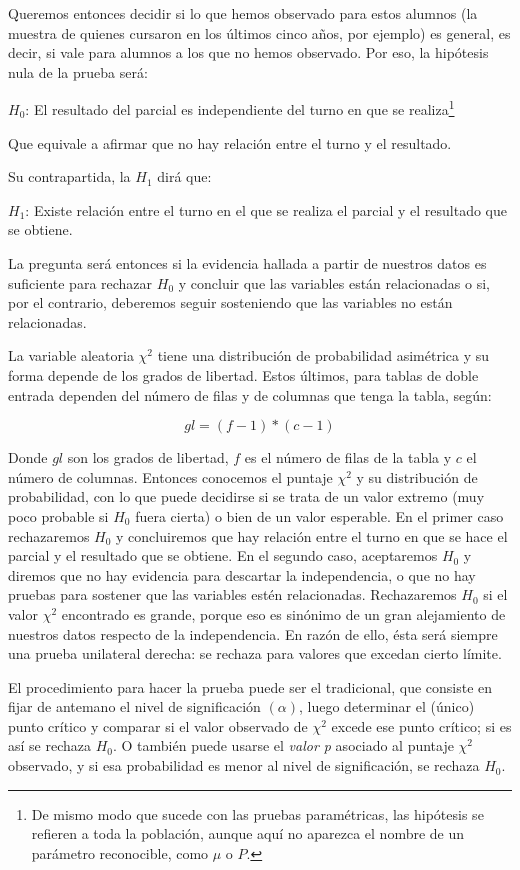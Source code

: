 \documentclass[]{book}
\let\rmarkdownfootnote\footnote%
\def\footnote{\protect\rmarkdownfootnote}
\begin{document}
Queremos entonces decidir si lo que hemos observado para estos alumnos
(la muestra de quienes cursaron en los últimos cinco años, por ejemplo)
es general, es decir, si vale para alumnos a los que no hemos observado.
Por eso, la hipótesis nula de la prueba será:

\(H_0\): El resultado del parcial es independiente del turno en que se
realiza\footnote{De mismo modo que sucede con las pruebas paramétricas, las hipótesis se refieren a toda la población, aunque aquí no aparezca el nombre de un parámetro reconocible, como \(\mu\) o \(P\).}

Que equivale a afirmar que no hay relación entre el turno y el
resultado.

Su contrapartida, la \(H_1\) dirá que:

\(H_1\): Existe relación entre el turno en el que se realiza el parcial y
el resultado que se obtiene.

La pregunta será entonces si la evidencia hallada a partir de nuestros
datos es suficiente para rechazar \(H_0\) y concluir que las variables
están relacionadas o si, por el contrario, deberemos seguir sosteniendo
que las variables no están relacionadas.

La variable aleatoria \(\chi^{2}\) tiene una distribución de probabilidad
asimétrica y su forma depende de los grados de libertad. Estos últimos,
para tablas de doble entrada dependen del número de filas y de columnas
que tenga la tabla, según:

\[gl = ( f - 1)*( c - 1)\]

Donde \(gl\) son los grados de libertad, \(f\) es el número de filas de la
tabla y \(c\) el número de columnas. Entonces conocemos el puntaje
\(\chi^{2}\) y su distribución de probabilidad, con lo que puede decidirse
si se trata de un valor extremo (muy poco probable si \(H_0\) fuera cierta)
o bien de un valor esperable. En el primer caso rechazaremos \(H_0\) y
concluiremos que hay relación entre el turno en que se hace el parcial y
el resultado que se obtiene. En el segundo caso, aceptaremos \(H_0\) y
diremos que no hay evidencia para descartar la independencia, o que no
hay pruebas para sostener que las variables estén relacionadas.
Rechazaremos \(H_0\) si el valor \(\chi^{2}\) encontrado es grande, porque
eso es sinónimo de un gran alejamiento de nuestros datos respecto de la
independencia. En razón de ello, ésta será siempre una prueba unilateral
derecha: se rechaza para valores que excedan cierto límite.

El procedimiento para hacer la prueba puede ser el tradicional, que
consiste en fijar de antemano el nivel de significación
\((\alpha)\), luego determinar el (único) punto crítico y
comparar si el valor observado de \(\chi^{2}\) excede ese punto crítico;
si es así se rechaza \(H_0\). O también puede usarse el \emph{valor p} asociado
al puntaje \(\chi^{2}\) observado, y si esa probabilidad es menor al nivel
de significación, se rechaza \(H_0\).
\end{document}
